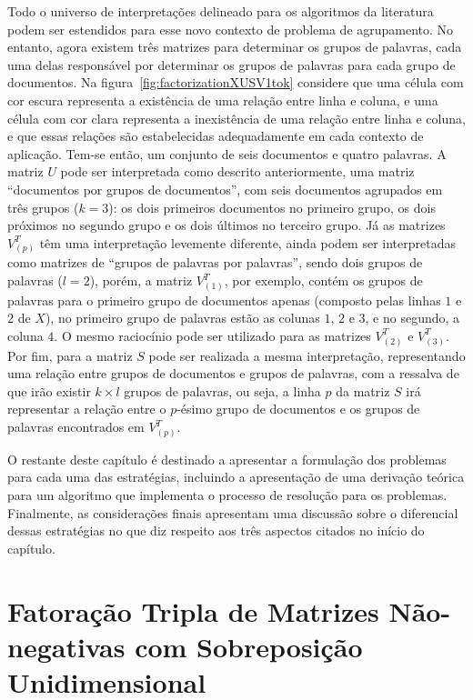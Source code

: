 \documentclass[
    12pt,                %
    oneside,            %
    a4paper,            %
    english,            %
    brazil                %
    ]{abntex2ppgsi}
\begin{document}
Todo o universo de interpretações delineado para os algoritmos da literatura podem ser estendidos para esse novo contexto de problema de agrupamento.
No entanto, agora existem três matrizes para determinar os grupos de palavras, cada uma delas responsável por determinar os grupos de palavras para cada grupo de documentos.
Na figura~\ref{fig:factorizationXUSV1tok} considere que uma célula com cor escura representa a existência de uma relação entre linha e coluna, e uma célula com cor clara representa a inexistência de uma relação entre linha e coluna, e que essas relações são estabelecidas adequadamente em cada contexto de aplicação.
Tem-se então, um conjunto de seis documentos e quatro palavras.
A matriz $U$ pode ser interpretada como descrito anteriormente, uma matriz ``documentos por grupos de documentos'', com seis documentos agrupados em três grupos ($k = 3$): os dois primeiros documentos no primeiro grupo, os dois próximos no segundo grupo e os dois últimos no terceiro grupo.
Já as matrizes $V_{(p)}^T$ têm uma interpretação levemente diferente, ainda podem ser interpretadas como matrizes de ``grupos de palavras por palavras'', sendo dois grupos de palavras ($l = 2$), porém, a matriz $V_{(1)}^T$, por exemplo, contém os grupos de palavras para o primeiro grupo de documentos apenas (composto pelas linhas $1$ e $2$ de $X$), no primeiro grupo de palavras estão as colunas $1$, $2$ e $3$, e no segundo, a coluna $4$.
O mesmo raciocínio pode ser utilizado para as matrizes $V_{(2)}^T$ e $V_{(3)}^T$.
Por fim, para a matriz $S$ pode ser realizada a mesma interpretação, representando uma relação entre grupos de documentos e grupos de palavras, com a ressalva de que irão existir $k \times l$ grupos de palavras, ou seja, a linha $p$ da matriz $S$ irá representar a relação entre o $p$-ésimo grupo de documentos e os grupos de palavras encontrados em $V_{(p)}^T$.

O restante deste capítulo é destinado a apresentar a formulação dos problemas para cada uma das estratégias, incluindo a apresentação de uma derivação teórica para um algoritmo que implementa o processo de resolução para os problemas.
Finalmente, as considerações finais apresentam uma discussão sobre o diferencial dessas estratégias no que diz respeito aos três aspectos citados no início do capítulo.


\section{Fatoração Tripla de Matrizes Não-negativas com Sobreposição Unidimensional}
\end{document}
